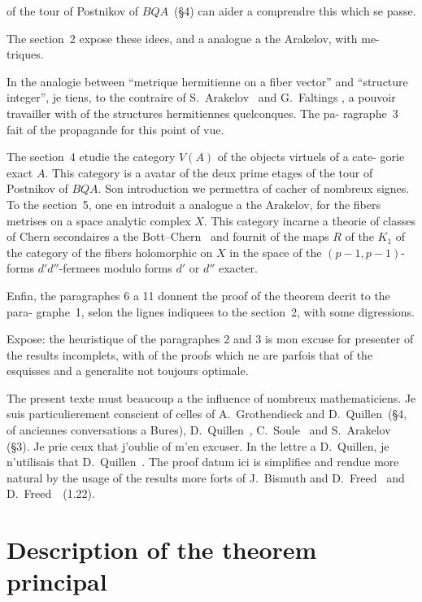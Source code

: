 \documentclass[12pt,a4paper]{article}
\theoremstyle{plain}
\theoremstyle{definition}
\begin{document}
\newpage
\noindent of the tour of Postnikov of $BQA$~(\S4) can aider a comprendre this which se passe.

The section~2 expose these idees, and a analogue a the Arakelov, with me-
triques.

In the analogie between ``metrique hermitienne on a fiber vector'' and
``structure integer'', je tiens, to the contraire of S.~Arakelov~\cite{1}\cite{2} and G.~Faltings
\cite{5}, a pouvoir travailler with of the structures hermitiennes quelconques. The pa-
ragraphe~3 fait of the propagande for this point of vue.

The section~4 etudie the category $V(A)$ of the objects virtuels of a cate-
gorie exact $A$. This category is a avatar of the deux prime etages of
the tour of Postnikov of $BQA$. Son introduction we permettra of cacher of
nombreux signes. To the section~5, one en introduit a analogue a the Arakelov,
for the fibers metrises on a space analytic complex $X$. This category
incarne a theorie of classes of Chern secondaires a the Bott--Chern~\cite{4} and fournit
of the maps $R$ of the $K_1$ of the category of the fibers holomorphic on $X$
in the space of the $(p-1,p-1)$-forms $d'd''$-fermees modulo forms $d'$ or $d''$
exacter.

Enfin, the paragraphes 6 a 11 donnent the proof of the theorem decrit to the para-
graphe~1, selon the lignes indiquees to the section~2, with some digressions.

Expose: the heuristique of the paragraphes 2 and 3 is mon excuse for presenter
of the results incomplets, with of the proofs which ne are parfois that of the
esquisses and a generalite not toujours optimale.

The present texte must beaucoup a the influence of nombreux mathematiciens. Je
suis particulierement conscient of celles of A.~Grothendieck and D.~Quillen~(\S4,
of anciennes conversations a Bures), D.~Quillen~\cite{13}, C.~Soule~\cite{14} and S.~Arakelov
(\S3). Je prie ceux that j'oublie of m'en excuser. In the lettre a D.~Quillen,
je n'utilisais that D.~Quillen~\cite{13}. The proof datum ici is simplifiee
and rendue more natural by the usage of the results more forts of J.~Bismuth and
D.~Freed~\cite{3} and D.~Freed~\cite{6}~(1.22).

\newpage

\tableofcontents

\newpage

\section{Description of the theorem principal}
\end{document}
